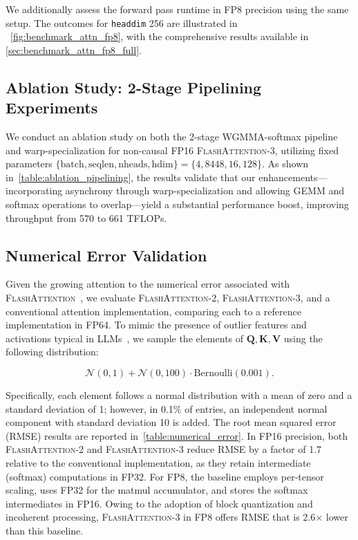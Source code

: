 \begin{enumerate}
\begin{algorithm}[H]
\begin{algorithmic}[1]
We additionally assess the forward pass runtime in FP8 precision using the same setup. The outcomes for \texttt{headdim} 256 are illustrated in ~\cref{fig:benchmark_attn_fp8}, with the comprehensive results available in \cref{sec:benchmark_attn_fp8_full}.

\subsection{Ablation Study: 2-Stage Pipelining Experiments}
\label{sec:2-stage-pipelining-experiments}

We conduct an ablation study on both the 2-stage WGMMA-softmax pipeline and warp-specialization for non-causal FP16 \textsc{FlashAttention-3}, utilizing fixed parameters $\{\text{batch}, \text{seqlen}, \text{nheads}, \text{hdim}\} = \{ 4, 8448, 16, 128\}$. As shown in~\cref{table:ablation_pipelining}, the results validate that our enhancements—incorporating asynchrony through warp-specialization and allowing GEMM and softmax operations to overlap—yield a substantial performance boost, improving throughput from 570 to 661 TFLOPs.

\subsection{Numerical Error Validation}
\label{sec:numerical_error}

Given the growing attention to the numerical error associated with \textsc{FlashAttention}~\citep{golden2024flash}, we evaluate \textsc{FlashAttention-2}, \textsc{FlashAttention-3}, and a conventional attention implementation, comparing each to a reference implementation in FP64. To mimic the presence of outlier features and activations typical in LLMs~\citep{dettmers2208llm, sun2024massive}, we sample the elements of $\mathbf{Q}, \mathbf{K}, \mathbf{V}$ using the following distribution:

\begin{equation*}
  \mathcal{N}(0, 1) + \mathcal{N}(0, 100) \cdot \mathrm{Bernoulli}(0.001).
\end{equation*}

Specifically, each element follows a normal distribution with a mean of zero and a standard deviation of 1; however, in 0.1\% of entries, an independent normal component with standard deviation 10 is added. The root mean squared error (RMSE) results are reported in~\cref{table:numerical_error}. In FP16 precision, both \textsc{FlashAttention-2} and \textsc{FlashAttention-3} reduce RMSE by a factor of 1.7 relative to the conventional implementation, as they retain intermediate (softmax) computations in FP32. For FP8, the baseline employs per-tensor scaling, uses FP32 for the matmul accumulator, and stores the softmax intermediates in FP16. Owing to the adoption of block quantization and incoherent processing, \textsc{FlashAttention-3} in FP8 offers RMSE that is 2.6$\times$ lower than this baseline.


\end{algorithmic}
\end{algorithm}
\end{enumerate}
